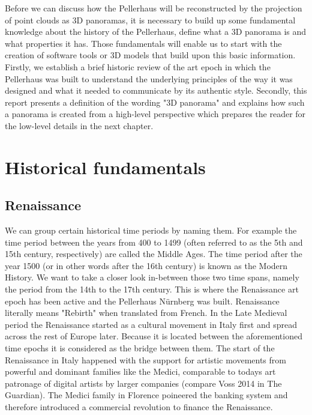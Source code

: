 Before we can discuss how the Pellerhaus will be reconstructed by the projection of point clouds as 3D panoramas, it is necessary to build up some fundamental knowledge about the history of the Pellerhaus, define what a 3D panorama is and what properties it has. Those fundamentals will enable us to start with the creation of software tools or 3D models that build upon this basic information. Firstly, we establish a brief historic review of the art epoch in which the Pellerhaus was built to understand the underlying principles of the way it was designed and what it needed to communicate by its authentic style. Secondly, this report presents a definition of the wording "3D panorama" and explains how such a panorama is created from a high-level perspective which prepares the reader for the low-level details in the next chapter.

\section{Historical fundamentals}

\subsection{Renaissance}

We can group certain historical time periods by naming them. For example the time period between the years from 400 to 1499 (often referred to as the 5th and 15th century, respectively) are called the Middle Ages. The time period after the year 1500 (or in other words after the 16th century) is known as the Modern History. We want to take a closer look in-between those two time spans, namely the period from the 14th to the 17th century. This is where the Renaissance art epoch has been active and the Pellerhaus Nürnberg was built. Renaissance literally means "Rebirth" when translated from French. In the Late Medieval period the Renaissance started as a cultural movement in Italy first and spread across the rest of Europe later. Because it is located between the aforementioned time epochs it is considered as the bridge between them. The start of the Renaissance in Italy happened with the support for artistic movements from powerful and dominant families like the Medici, comparable to todays art patronage of digital artists by larger companies (compare Voss 2014 \parencite{art_patronage_google} in The Guardian). The Medici family in Florence poineered the banking system and therefore introduced a commercial revolution to finance the Renaissance.

